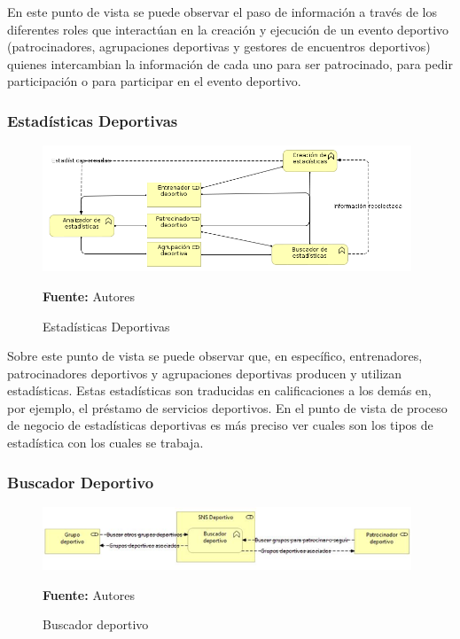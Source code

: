 En este punto de vista se puede observar el paso de información a través de los diferentes roles que interactúan en la creación y ejecución de un evento deportivo (patrocinadores, agrupaciones deportivas y gestores de encuentros deportivos) quienes intercambian la información de cada uno para ser patrocinado, para pedir participación o para participar en el evento deportivo.

\subsubsection{Estadísticas Deportivas}

\begin{figure}[!htb]
  \begin{center}
    \includegraphics[width=11cm]{./imagenes/Archimate/vistas/business_functions/estadisticasdeportivas.png}
    \caption{Estadísticas Deportivas}
    \label{fig:bf_estadisticas_deportivas}
    \textbf{Fuente:}  Autores
  \end{center}
\end{figure}

Sobre este punto de vista se puede observar que, en específico, entrenadores, patrocinadores deportivos y agrupaciones deportivas producen y utilizan estadísticas. Estas estadísticas son traducidas en calificaciones a los demás en, por ejemplo, el préstamo de servicios deportivos. En el punto de vista de proceso de negocio de estadísticas deportivas es más preciso ver cuales son los tipos de estadística con los cuales se trabaja.

\subsubsection{Buscador Deportivo}

\begin{figure}[!htb]
  \begin{center}
    \includegraphics[width=11cm]{./imagenes/Archimate/vistas/business_functions/buscadordeportivo.png}
    \caption{Buscador deportivo}
    \label{fig:BF_BuscadorDeportivo}
    \textbf{Fuente:}  Autores
  \end{center}
\end{figure}

